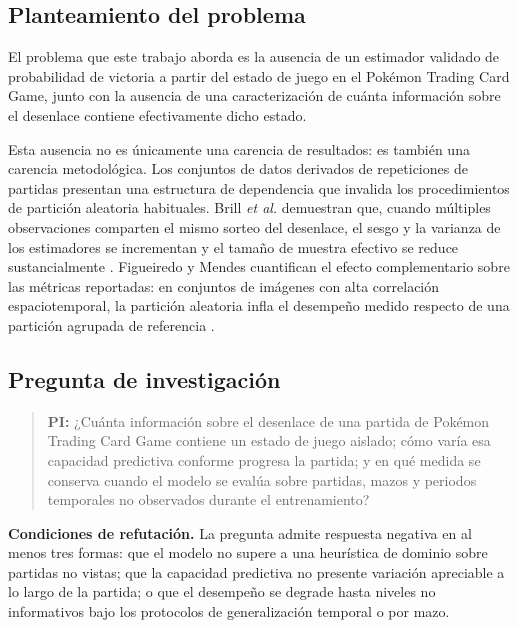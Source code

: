 \subsection{Planteamiento del problema}
\label{subsec:problema}

El problema que este trabajo aborda es la ausencia de un estimador validado
de probabilidad de victoria a partir del estado de juego en el Pok\'emon
Trading Card Game, junto con la ausencia de una caracterización de cuánta
información sobre el desenlace contiene efectivamente dicho estado.

Esta ausencia no es únicamente una carencia de resultados: es también una
carencia metodológica. Los conjuntos de datos derivados de repeticiones de
partidas presentan una estructura de dependencia que invalida los
procedimientos de partición aleatoria habituales. Brill \textit{et al.}
demuestran que, cuando múltiples observaciones comparten el mismo sorteo
del desenlace, el sesgo y la varianza de los estimadores se incrementan y
el tamaño de muestra efectivo se reduce sustancialmente
\cite{brill_winprob_2026}. Figueiredo y Mendes cuantifican el efecto
complementario sobre las métricas reportadas: en conjuntos de imágenes con
alta correlación espaciotemporal, la partición aleatoria infla el
desempeño medido respecto de una partición agrupada de referencia
\cite{figueiredo_leakage_2024}.


\subsection{Pregunta de investigación}
\label{subsec:pregunta}

\begin{quote}
\textbf{PI:} ¿Cuánta información sobre el desenlace de una partida de
Pok\'emon Trading Card Game contiene un estado de juego aislado; cómo varía
esa capacidad predictiva conforme progresa la partida; y en qué medida se
conserva cuando el modelo se evalúa sobre partidas, mazos y periodos
temporales no observados durante el entrenamiento?
\end{quote}

\noindent\textbf{Condiciones de refutación.} La pregunta admite respuesta
negativa en al menos tres formas: que el modelo no supere a una heurística
de dominio sobre partidas no vistas; que la capacidad predictiva no
presente variación apreciable a lo largo de la partida; o que el desempeño
se degrade hasta niveles no informativos bajo los protocolos de
generalización temporal o por mazo.

